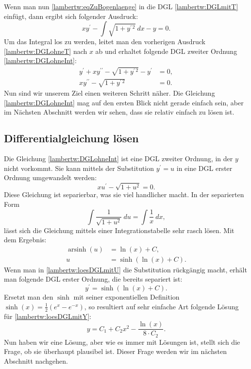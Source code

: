 Wenn man nun \eqref{lambertw:eqZuBogenlaenge} in die DGL \eqref{lambertw:DGLmitT} einfügt, dann ergibt sich folgender Ausdruck:
\begin{equation}
	x y^{\prime} - \int\sqrt{1+y^{\prime\, 2}} \: dx - y
	= 0.
	\label{lambertw:DGLohneT}
\end{equation}
Um das Integral los zu werden, leitet man den vorherigen Ausdruck \eqref{lambertw:DGLohneT} nach \(x\) ab und erhaltet folgende DGL zweiter Ordnung \eqref{lambertw:DGLohneInt}:
\begin{align}
	y^{\prime}+ xy^{\prime\prime} - \sqrt{1+y^{\prime\, 2}} - y^{\prime}
	&= 0, \\
	xy^{\prime\prime} - \sqrt{1+y^{\prime\, 2}}
	&= 0.
	\label{lambertw:DGLohneInt}
\end{align}
Nun sind wir unserem Ziel einen weiteren Schritt näher. Die Gleichung \eqref{lambertw:DGLohneInt} mag auf den ersten Blick nicht gerade einfach sein, aber im Nächsten Abschnitt werden wir sehen, dass sie relativ einfach zu lösen ist.

\subsection{Differentialgleichung lösen
	\label{lambertw:subsection:DGLloes}}
Die Gleichung \eqref{lambertw:DGLohneInt} ist eine DGL zweiter Ordnung, in der \(y\) nicht vorkommt. Sie kann mittels der Substitution \(y^{\prime} = u\) in eine DGL erster Ordnung umgewandelt werden:
\begin{equation}
	xu^{\prime} - \sqrt{1+u^2}
	= 0.
	\label{lambertw:DGLmitU}
\end{equation}
Diese Gleichung ist separierbar, was sie viel handlicher macht. In der separierten Form
\begin{equation}
	\int{\frac{1}{\sqrt{1+u^2}}\:du} 
	= 
	\int{\frac{1}{x}\:dx},
\end{equation}
lässt sich die Gleichung mittels einer Integrationstabelle sehr rasch lösen. 
Mit dem Ergebnis: 
\begin{align}
	\operatorname{arsinh}(u)
	&=
	\operatorname{ln}(x) + C, \\
	u
	&=
	\operatorname{sinh}(\operatorname{ln}(x) + C).
	\label{lambertw:loesDGLmitU}
\end{align}
Wenn man in \eqref{lambertw:loesDGLmitU} die Substitution rückgängig macht, erhält man folgende DGL erster Ordnung, die bereits separiert ist:
\begin{equation}
	y^{\prime}
	=
	\operatorname{sinh}(\operatorname{ln}(x) + C).
	\label{lambertw:loesDGLmitY}
\end{equation}
Ersetzt man den \(\operatorname{sinh}\) mit seiner exponentiellen Definition \(\operatorname{sinh}(x)=\frac{1}{2}(e^x-e^{-x})\), so resultiert auf sehr einfache Art folgende Lösung für \eqref{lambertw:loesDGLmitY}:
\begin{equation}
	y
	=
	C_1 + C_2 x^2 - \frac{\operatorname{ln}(x)}{8 \cdot C_2}.
\end{equation}
Nun haben wir eine Lösung, aber wie es immer mit Lösungen ist, stellt sich die Frage, ob sie überhaupt plausibel ist. Dieser Frage werden wir im nächsten Abschnitt nachgehen.

